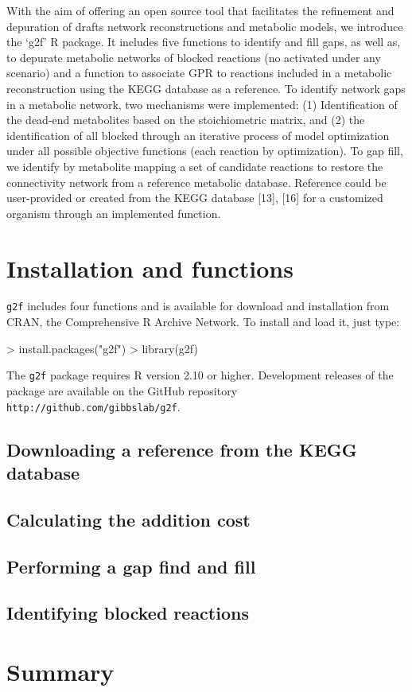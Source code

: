 With the aim of offering an open source tool that facilitates the refinement and depuration of drafts network reconstructions and metabolic models, we introduce the ‘g2f’ R package. It includes five functions to identify and fill gaps, as well as, to depurate metabolic networks of blocked reactions (no activated under any scenario) and a function to associate GPR to reactions included in a metabolic reconstruction using the KEGG database as a reference. To identify network gaps in a metabolic network, two mechanisms were implemented: (1) Identification of the dead-end metabolites based on the stoichiometric matrix, and (2) the identification of all blocked through an iterative process of model optimization under all possible objective functions (each reaction by optimization). To gap fill, we identify by metabolite mapping a set of candidate reactions to restore the connectivity network from a reference metabolic database. Reference could be user-provided or created from the KEGG database [13], [16] for a customized organism through an implemented function.
\section{Installation and functions}
\texttt{g2f} includes four functions and is available for download and installation from CRAN, the
Comprehensive R Archive Network. To install and load it, just type:
\begin{Schunk}
\begin{Sinput}
> install.packages("g2f")
> library(g2f)
\end{Sinput}
\end{Schunk}
The \texttt{g2f} package requires R version 2.10 or higher. Development releases of the package are available on the GitHub repository \texttt{http://github.com/gibbslab/g2f}.
\subsection{Downloading a reference from the KEGG database}
\subsection{Calculating the addition cost}
\subsection{Performing a gap find and fill}
\subsection{Identifying blocked reactions}

\section{Summary}